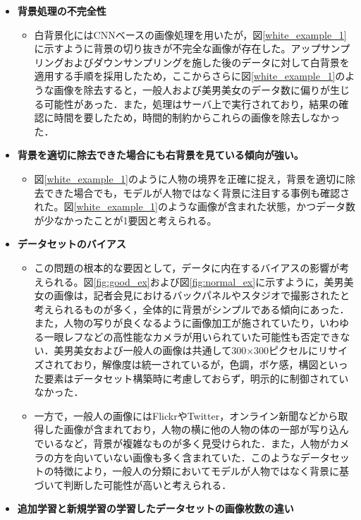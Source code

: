 \documentclass[a4paper,11pt,titlepage]{jsarticle}
\begin{document}
\begin{itemize}
  \item \textbf{背景処理の不完全性}
    \begin{itemize}
      \item 白背景化にはCNNベースの画像処理を用いたが，図\ref{white_example_1}に示すように背景の切り抜きが不完全な画像が存在した。アップサンプリングおよびダウンサンプリングを施した後のデータに対して白背景を適用する手順を採用したため，ここからさらに図\ref{white_example_1}のような画像を除去すると，一般人および美男美女のデータ数に偏りが生じる可能性があった．また，処理はサーバ上で実行されており，結果の確認に時間を要したため，時間的制約からこれらの画像を除去しなかった．
    \end{itemize}

  \item \textbf{背景を適切に除去できた場合にも右背景を見ている傾向が強い。}
  \begin{itemize}
  \item 図\ref{white_example_1}のように人物の境界を正確に捉え，背景を適切に除去できた場合でも，モデルが人物ではなく背景に注目する事例も確認された。図\ref{white_example_1}のような画像が含まれた状態，かつデータ数が少なかったことが1要因と考えられる。
  \end{itemize}
  \item \textbf{データセットのバイアス}
    \begin{itemize}
      \item この問題の根本的な要因として，データに内在するバイアスの影響が考えられる。図\ref{fig:good_ex}および図\ref{fig:normal_ex}に示すように，美男美女の画像は，記者会見におけるバックパネルやスタジオで撮影されたと考えられるものが多く，全体的に背景がシンプルである傾向にあった．また，人物の写りが良くなるように画像加工が施されていたり，いわゆる一眼レフなどの高性能なカメラが用いられていた可能性も否定できない．美男美女および一般人の画像は共通して300×300ピクセルにリサイズされており，解像度は統一されているが，色調，ボケ感，構図といった要素はデータセット構築時に考慮しておらず，明示的に制御されていなかった．
      \item 一方で，一般人の画像にはFlickrやTwitter，オンライン新聞などから取得した画像が含まれており，人物の横に他の人物の体の一部が写り込んでいるなど，背景が複雑なものが多く見受けられた．また，人物がカメラの方を向いていない画像も多く含まれていた．このようなデータセットの特徴により，一般人の分類においてモデルが人物ではなく背景に基づいて判断した可能性が高いと考えられる．
    \end{itemize}
    \item \textbf{追加学習と新規学習の学習したデータセットの画像枚数の違い}

\end{itemize}
\end{document}
